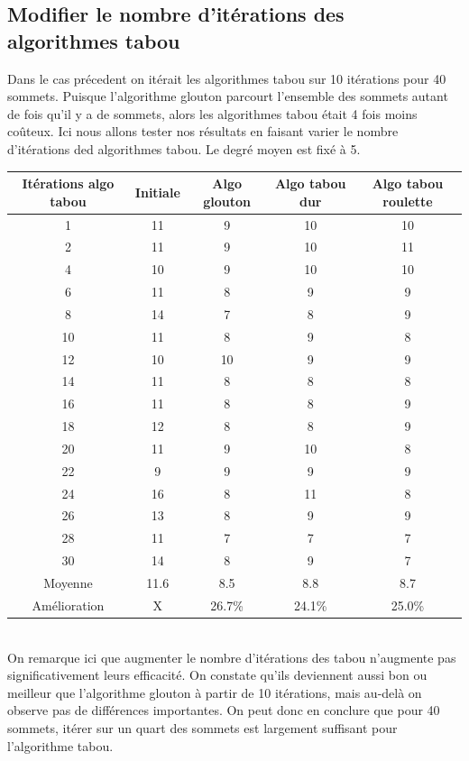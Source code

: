 \documentclass[a4paper,11pt]{article}
\begin{document}
	\subsection{Modifier le nombre d'itérations des algorithmes tabou}
		Dans le cas précedent on itérait les algorithmes tabou sur 10 itérations pour 40 sommets. Puisque l'algorithme glouton parcourt l'ensemble des sommets autant de fois qu'il y a de sommets, alors les algorithmes tabou était 4 fois moins coûteux. Ici nous allons tester nos résultats en faisant varier le nombre d'itérations ded algorithmes tabou.
		Le degré moyen est fixé à 5.
		\begin{tabular}{|c|c|c|c|c|}
  		\hline
  		Itérations algo tabou & Initiale & Algo glouton & Algo tabou dur & Algo tabou roulette\\
  		\hline
  		1 & 11 & 9 & 10 & 10\\
  		\hline
  		2 & 11 & 9 & 10 & 11\\
  		\hline
  		4 & 10 & 9 & 10 & 10\\
  		\hline
  		6 & 11 & 8 & 9 & 9\\
  		\hline
  		8 & 14 & 7 & 8 & 9\\
  		\hline
  		10 & 11 & 8 & 9 & 8\\
  		\hline
  		12 & 10 & 10 & 9 & 9\\
  		\hline
  		14 & 11 & 8 & 8 & 8\\
  		\hline
  		16 & 11 & 8 & 8 & 9\\
  		\hline
  		18 & 12 & 8 & 8 & 9\\
  		\hline
  		20 & 11 & 9 & 10 & 8\\
  		\hline
  		22 & 9 & 9 & 9 & 9\\
  		\hline
  		24 & 16 & 8 & 11 & 8\\
  		\hline
  		26 & 13 & 8 & 9 & 9\\
  		\hline
  		28 & 11 & 7 & 7 & 7\\
  		\hline
  		30 & 14 & 8 & 9 & 7\\
  		\hline
  		Moyenne & 11.6 & 8.5 & 8.8 & 8.7\\
  		\hline
  		Amélioration & X & 26.7\% & 24.1\% & 25.0\%\\
  		\hline
	\end{tabular}
	\\
	On remarque ici que augmenter le nombre d'itérations des tabou n'augmente pas significativement leurs efficacité. On constate qu'ils deviennent aussi bon ou meilleur que l'algorithme glouton à partir de 10 itérations, mais au-delà on observe pas de différences importantes. On peut donc en conclure que pour 40 sommets, itérer sur un quart des sommets est largement suffisant pour l'algorithme tabou.
\end{document}
